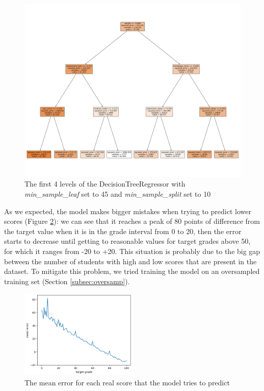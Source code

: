 \documentclass{article}
\begin{document}
\begin{figure}[h!]
\centering
\includegraphics[width=1.0\textwidth]{DTstructure.png}
\caption{\label{fig:dtstruct}The first 4 levels of the DecisionTreeRegressor with \textit{min\_sample\_leaf} set to 45 and \textit{min\_sample\_split} set to 10}
\end{figure}
\newpage

As we expected, the model makes bigger mistakes when trying to predict lower scores (Figure \ref{fig:dtperf}): we can see that it reaches a peak of 80 points of difference from the target value when it is in the grade interval from 0 to 20, then the error starts to decrease until getting to reasonable values for target grades above 50, for which it ranges from -20 to +20. This situation is probably due to the big gap between the number of students with high and low scores that are present in the dataset. To mitigate this problem, we tried training the model on an oversampled training set (Section \ref{subsec:oversamp}).

\begin{figure}[h!]
\centering
\includegraphics[width=0.5\textwidth]{DTnew.png}
\caption{\label{fig:dtperf}The mean error for each real score that the model tries to predict}
\end{figure}
\end{document}
